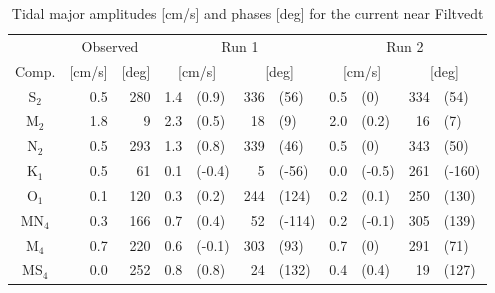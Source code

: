 \begin{table}[ht]
\caption{Tidal major amplitudes [cm/s] and phases [deg] for the current near Filtvedt}
\label{tab:Filtvedt}
\centering
\begin{tabular}{crrr@{ }lr@{ }lr@{ }lr@{ }l} \hline
      & \multicolumn{2}{c}{Observed} & \multicolumn{4}{c}{Run 1} & \multicolumn{4}{c}{Run 2} \\%
Comp. & [cm/s] & [deg] & \multicolumn{2}{c}{[cm/s]} & \multicolumn{2}{c}{[deg]} & \multicolumn{2}{c}{[cm/s]} & \multicolumn{2}{c}{[deg]} \\ \hline %
S$_2$   &  0.5 & 280  &   1.4 & (0.9)  & 336 & (56)   &  0.5 & (0)    & 334 & (54)   \\ %
M$_2$   &  1.8 &   9  &   2.3 & (0.5)  &  18 & (9)    &  2.0 & (0.2)  &  16 & (7)    \\ %
N$_2$   &  0.5 & 293  &   1.3 & (0.8)  & 339 & (46)   &  0.5 & (0)    & 343 & (50)   \\ %
K$_1$   &  0.5 &  61  &   0.1 & (-0.4) &   5 & (-56)  &  0.0 & (-0.5) & 261 & (-160) \\ %
O$_1$   &  0.1 & 120  &   0.3 & (0.2)  & 244 & (124)  &  0.2 & (0.1)  & 250 & (130)  \\ %
MN$_4$  &  0.3 & 166  &   0.7 & (0.4)  &  52 & (-114) &  0.2 & (-0.1) & 305 & (139)  \\ %
M$_4$   &  0.7 & 220  &   0.6 & (-0.1) & 303 & (93)   &  0.7 & (0)    & 291 & (71)   \\ %
MS$_4$  &  0.0 & 252  &   0.8 & (0.8)  &  24 & (132)  &  0.4 & (0.4)  &  19 & (127)  \\ %
\hline 
\end{tabular}
\end{table}

